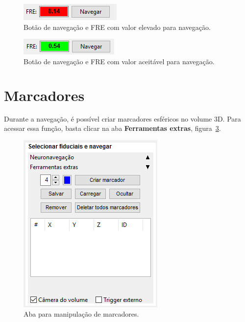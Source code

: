 \begin{figure}[!htb]
\centering
\includegraphics[scale=0.6]{../user_guide_figures/invesalius_screen/nav_fre_error_pt.png}
\caption{Botão de navegação e FRE com valor elevado para navegação.}
\label{fig:nav_fre_error}
\end{figure}

\begin{figure}[!htb]
\centering
\includegraphics[scale=0.6]{../user_guide_figures/invesalius_screen/nav_fre_ok_pt.png}
\caption{Botão de navegação e FRE com valor aceitável para navegação.}
\label{fig:nav_fre_ok}
\end{figure}

\section{Marcadores}

Durante a navegação, é possível criar marcadores esféricos no volume 3D. Para acessar essa função, basta clicar na aba \textbf{Ferramentas extras}, figura~\ref{fig:nav_extra_tools}.

\begin{figure}[!htb]
\centering
\includegraphics[scale=0.6]{../user_guide_figures/invesalius_screen/nav_extra_tools_pt.png}
\caption{Aba para manipulação de marcadores.}
\label{fig:nav_extra_tools}
\end{figure}

